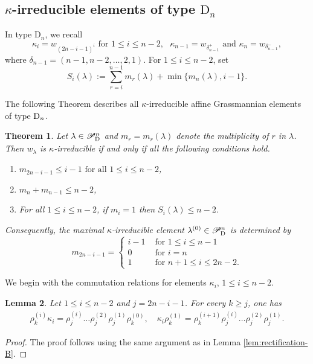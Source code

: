 \documentclass[a4paper]{amsart}
\newtheorem{thm}{Theorem}[section]
\newtheorem{lem}[thm]{Lemma}
\theoremstyle{remark}
\numberwithin{equation}{section}
\begin{document}
\subsection{$\kappa$-irreducible elements of type $\mathrm{D}_n$}

In type $\mathrm{D}_n$, we recall 
$$\kappa_i=w_{(2n-i-1)^i} \text{ for } 1\leq i\leq n-2,~~~ \kappa_{n-1}=w_{\delta_{n-1}^+} \text{ and } \kappa_{n}=w_{\delta_{n-1}^-},$$ where $\delta_{n-1}=(n-1,n-2,\dots,2,1)$. For $1\leq i\leq n-2$, set
\[
 S_i(\lambda)
 :=\sum_{r=i}^{n-1}m_r(\lambda)+\min\{m_n(\lambda),i-1\}.
\]

The following Theorem describes all $\kappa$-irreducible affine Grassmannian elements of type $\mathrm{D}_{n}$.
\begin{thm}\label{thm:kappa-irr-type-D}
Let \(\lambda\in\mathscr{P}^n_{\mathrm{D}_{}}\) and \(m_r=m_r(\lambda)\) denote the
multiplicity of \(r\) in \(\lambda\). Then \(w_\lambda\) is
\(\kappa\)-irreducible if and only if all the following conditions hold.
\begin{enumerate}
    \item[(A1)] $m_{2n-i-1}\le i-1 \text{ for all } 1\le i\le n-2$, \\
    \item[(A2)] $m_n+m_{n-1}\leq n-2$, \\
    \item[(A3)] For all $1\leq i\le n-2$, if $m_i=1$ then $S_i(\lambda)\le n-2$.
\end{enumerate}

Consequently, the maximal \(\kappa\)-irreducible element
\(\lambda^{(0)}\in\mathscr{P}^n_{\mathrm{D}_{}}\) is determined by
\[m_{2n-i-1}=
  \begin{cases}i-1 & \text{ for } 1\leq i\leq n-1\\0 & \text{ for } i=n\\ 1 & \text{ for } n+1\leq i \leq 2n-2.
  \end{cases}\]   
\end{thm}

We begin with the commutation relations for elements
$\kappa_i$, $1\leq i\leq n-2$.

\begin{lem}\label{lem:rectification-D}
Let $1\le i\le n-2$ and \(j=2n-i-1\). For every \(k\geq j\), one has 
\begin{align}\label{eq_kap_irr_D}
\rho_k^{(i)}\kappa_i=\rho_j^{(i)}\dots\rho_j^{(2)}\rho_j^{(1)}\rho_k^{(0)}, \quad
\kappa_i\rho_k^{(1)}=\rho_k^{(i+1)}\rho_j^{(i)}\dots\rho_j^{(2)}\rho_j^{(1)}.
\end{align}
\end{lem} 
\begin{proof}
    The proof follows using the same argument as in Lemma \ref{lem:rectification-B}.
\end{proof}
 
\end{document}
